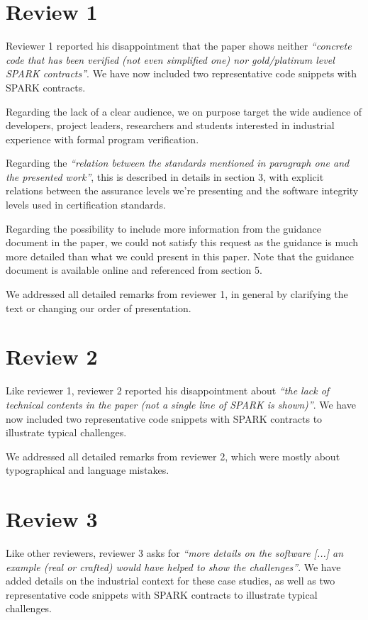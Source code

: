 \documentclass{eceasst}
\begin{document}
\appendix

\section{Review 1}

Reviewer 1 reported his disappointment that the paper shows neither
\textit{``concrete code that has been verified (not even simplified one) nor
  gold/platinum level SPARK contracts''}. We have now included two
representative code snippets with SPARK contracts.

Regarding the lack of a clear audience, we on purpose target the wide audience
of developers, project leaders, researchers and students interested in
industrial experience with formal program verification.

Regarding the \textit{``relation between the standards mentioned in paragraph
  one and the presented work''}, this is described in details in section 3,
with explicit relations between the assurance levels we're presenting and the
software integrity levels used in certification standards.

Regarding the possibility to include more information from the guidance
document in the paper, we could not satisfy this request as the guidance is
much more detailed than what we could present in this paper. Note that the
guidance document is available online and referenced from section 5.

We addressed all detailed remarks from reviewer 1, in general by clarifying the
text or changing our order of presentation.

\section{Review 2}

Like reviewer 1, reviewer 2 reported his disappointment about \textit{``the
  lack of technical contents in the paper (not a single line of SPARK is
  shown)''}. We have now included two representative code snippets with SPARK
contracts to illustrate typical challenges.

We addressed all detailed remarks from reviewer 2, which were mostly about
typographical and language mistakes.

\section{Review 3}

Like other reviewers, reviewer 3 asks for \textit{``more details on the
  software [...] an example (real or crafted) would have helped to show the
  challenges''}. We have added details on the industrial context for these case
studies, as well as two representative code snippets with SPARK contracts to
illustrate typical challenges.



\end{document}
